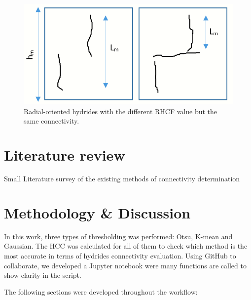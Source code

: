 \documentclass[12pt]{article}
\begin{document}
\begin{figure}[h] %
    \centering
    \includegraphics[width=4.5in]{RHCF comparison 2.png}
    \caption{Radial-oriented hydrides with the different RHCF value but the same connectivity.}
    \label{fig:my_label}
\end{figure}


\section{Literature review}

Small Literature survey of the existing methods of connectivity determination

\cite{COLAS2013586}
\cite{SHARMA2018546}
\cite{SUNIL2020152457}

\section{Methodology \& Discussion}

In this work, three types of thresholding was performed: Otsu, K-mean and Gaussian. The HCC was calculated for all of them to check which method is the most accurate in terms of hydrides connectivity evaluation. Using GitHub to collaborate, we developed a Jupyter notebook were many functions are called to show clarity in the script.

The following sections were developed throughout the workflow:
\end{document}
